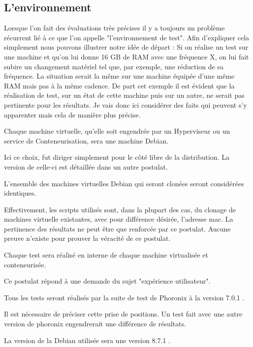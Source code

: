 \subsection{L'environnement}
Lorsque l'on fait des évaluations très précises il y a toujours un problème récurrent lié à ce que l'on appelle "l'environnement de test". Afin d'expliquer cela simplement nous pouvons illustrer notre idée de départ : Si on réalise un test sur une machine et qu'on lui donne 16 GB de RAM avec une fréquence X, on lui fait subire un changement matériel tel que, par exemple, une réduction de sa fréquence. La situation serait la même sur une machine équipée d'une même RAM mais pas à la même cadence. De part cet exemple il est évident que la réalisation de test, sur un état de cette machine puis sur un autre, ne serait pas pertinente pour les résultats. Je vais donc ici considérer des faits qui peuvent s'y apparenter mais cela de manière plus précise. 
\begin{post}
Chaque machine virtuelle, qu'elle soit engendrée par un Hyperviseur ou un service de Conteneurisation, sera une machine Debian.  
\end{post}
Ici ce choix, fut diriger simplement pour le côté libre de la distribution. La version de celle-ci est détaillée dans un autre postulat.
\begin{post}
L'ensemble des machines virtuelles Debian qui seront clonées seront considérées identiques. 
\end{post}
Effectivement, les scripts utilisés sont, dans la plupart des cas, du clonage de machines virtuelle existantes, avec pour différence désirée, l’adresse mac. La pertinence des résultats ne peut être que renforcée par ce postulat. Aucune preuve n'existe pour prouver la véracité de ce postulat.
\begin{post}
Chaque test sera réalisé en interne de chaque machine virtualisée et conteneurisée.
\end{post}
Ce postulat répond à une demande du sujet "expérience utilisateur".
\begin{post}
Tous les tests seront réalisés par la suite de test de Phoronix à la version 7.0.1 .
\end{post}
Il est nécessaire de préciser cette prise de positions. Un test fait avec une autre version de phoronix engendrerait une différence de résultats.
\begin{post}
La version de la Debian utilisée sera une version 8.7.1 .
\end{post}

